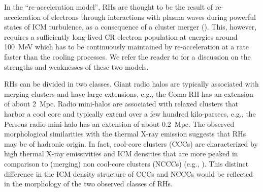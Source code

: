 \documentclass[useAMS,usenatbib]{mn2e}
\begin{document}
In the ``re-acceleration model'', RHs are thought to be the result of
re-acceleration of electrons through interactions with plasma waves during
powerful states of ICM turbulence, as a consequence of a cluster merger
(\citealp{1987A&A...182...21S, 1993ApJ...406..399G, 2002A&A...386..456G,
  2004MNRAS.350.1174B, 2005MNRAS.363.1173B, 2007MNRAS.378..245B,
  2010arXiv1008.0184B, 2009A&A...507..661B, 2012arXiv1211.3337D}). This,
however, requires a sufficiently long-lived CR electron population at energies
around 100~MeV which has to be continuously maintained by re-acceleration at a
rate faster than the cooling processes.  We refer the reader to
\citet{2011A&A...527A..99E} for a discussion on the strengths and weaknesses of
these two models.

RHs can be divided in two classes. Giant radio halos are typically associated
with merging clusters and have large extensions, e.g., the Coma RH has
an extension of about 2~Mpc. Radio mini-halos are associated with relaxed
clusters that harbor a cool core and typically extend over a few hundred
kilo-parsecs, e.g., the Perseus radio mini-halo has an extension of about
0.2~Mpc.  The observed morphological similarities with the thermal X-ray
emission suggests that RHs may be of hadronic origin. In fact, cool-core
clusters (CCCs) are characterized by high thermal X-ray emissivities and ICM
densities that are more peaked in comparison to (merging) non cool-core clusters
(NCCCs) (e.g., \citealp{2008A&A...487..431C}). This distinct difference in the
ICM density structure of CCCs and NCCCs would be reflected in the morphology 
of the two observed classes of RHs.
\end{document}

